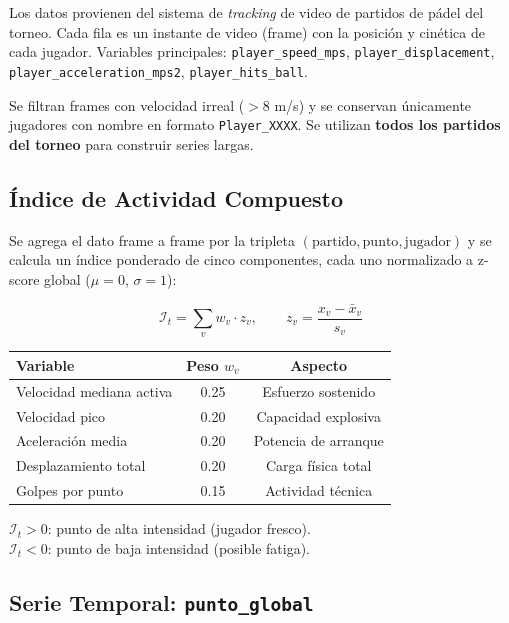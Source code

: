 \documentclass[10pt,twocolumn]{article}
\begin{document}
Los datos provienen del sistema de \textit{tracking} de video de partidos de
p\'adel del torneo. Cada fila es un instante de video (frame) con la posici\'on
y cin\'etica de cada jugador. Variables principales:
\texttt{player\_speed\_mps}, \texttt{player\_displacement},
\texttt{player\_acceleration\_mps2}, \texttt{player\_hits\_ball}.

Se filtran frames con velocidad irreal ($>8$ m/s) y se conservan \'unicamente
jugadores con nombre en formato \texttt{Player\_XXXX}. Se utilizan
\textbf{todos los partidos del torneo} para construir series largas.

\subsection{Índice de Actividad Compuesto}

Se agrega el dato frame a frame por la tripleta
$(\text{partido}, \text{punto}, \text{jugador})$ y se calcula un \'indice
ponderado de cinco componentes, cada uno normalizado a z-score global
($\mu=0$, $\sigma=1$):

\begin{equation}
  \mathcal{I}_t = \sum_{v} w_v \cdot z_v, \qquad
  z_v = \frac{x_v - \bar{x}_v}{s_v}
\end{equation}

\begin{center}
\small
\begin{tabular}{lcc}
  \toprule
  \textbf{Variable} & \textbf{Peso} $w_v$ & \textbf{Aspecto} \\
  \midrule
  Velocidad mediana activa & 0.25 & Esfuerzo sostenido \\
  Velocidad pico           & 0.20 & Capacidad explosiva \\
  Aceleraci\'on media      & 0.20 & Potencia de arranque \\
  Desplazamiento total     & 0.20 & Carga f\'isica total \\
  Golpes por punto         & 0.15 & Actividad t\'ecnica \\
  \bottomrule
\end{tabular}
\end{center}

$\mathcal{I}_t > 0$: punto de alta intensidad (jugador fresco).\\
$\mathcal{I}_t < 0$: punto de baja intensidad (posible fatiga).

\subsection{Serie Temporal: \texttt{punto\_global}}
\end{document}
